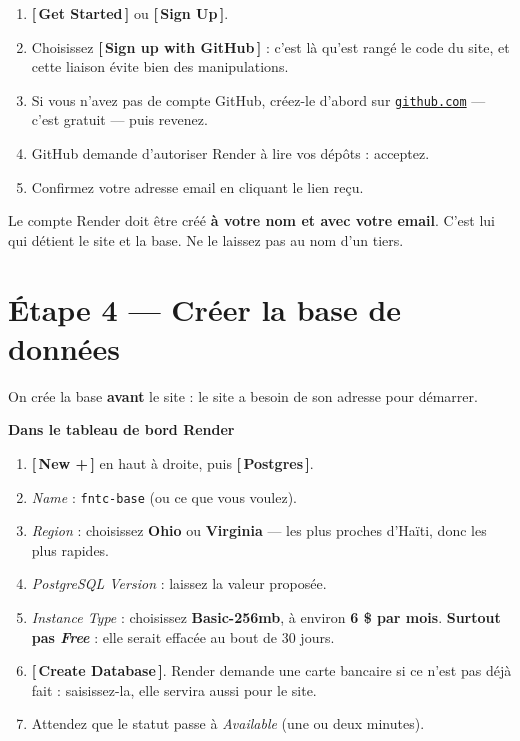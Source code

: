 \documentclass[11pt,a4paper]{article}
\newcommand{\bouton}[1]{\textbf{\textcolor{sig}{[\,#1\,]}}}
\newcommand{\champ}[1]{\textit{#1}}
\newcommand{\saisir}[1]{\texttt{#1}}
\newcommand{\lien}[2]{\href{#1}{\texttt{#2}}}
\begin{document}
\begin{enumerate}
  \item \bouton{Get Started} ou \bouton{Sign Up}.
  \item Choisissez \bouton{Sign up with GitHub} : c'est là qu'est rangé le code
        du site, et cette liaison évite bien des manipulations.
  \item Si vous n'avez pas de compte GitHub, créez-le d'abord sur
        \lien{https://github.com}{github.com} — c'est gratuit — puis revenez.
  \item GitHub demande d'autoriser Render à lire vos dépôts : acceptez.
  \item Confirmez votre adresse email en cliquant le lien reçu.
\end{enumerate}

\begin{attention}
Le compte Render doit être créé \textbf{à votre nom et avec votre email}. C'est
lui qui détient le site et la base. Ne le laissez pas au nom d'un tiers.
\end{attention}

\section{Étape 4 — Créer la base de données}

On crée la base \textbf{avant} le site : le site a besoin de son adresse pour
démarrer.

\begin{etape}
\textbf{Dans le tableau de bord Render}
\end{etape}

\begin{enumerate}
  \item \bouton{New +} en haut à droite, puis \bouton{Postgres}.
  \item \champ{Name} : \saisir{fntc-base} (ou ce que vous voulez).
  \item \champ{Region} : choisissez \textbf{Ohio} ou \textbf{Virginia} — les
        plus proches d'Haïti, donc les plus rapides.
  \item \champ{PostgreSQL Version} : laissez la valeur proposée.
  \item \champ{Instance Type} : choisissez \textbf{Basic-256mb}, à environ
        \textbf{6 \$ par mois}. \textbf{Surtout pas \champ{Free}} : elle serait
        effacée au bout de 30 jours.
  \item \bouton{Create Database}. Render demande une carte bancaire si ce n'est
        pas déjà fait : saisissez-la, elle servira aussi pour le site.
  \item Attendez que le statut passe à \champ{Available} (une ou deux minutes).
\end{enumerate}
\end{document}
